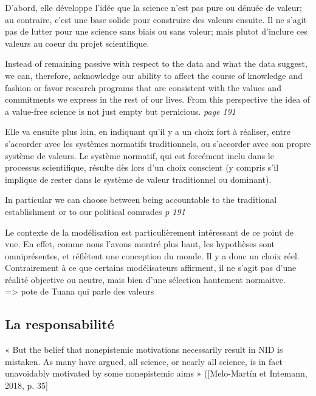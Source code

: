 D'abord, elle développe l'idée que la science n'est pas pure ou dénuée de valeur; au contraire, c'est une base solide pour construire des valeurs ensuite. Il ne s'agit pas de lutter pour une science sans biais ou sans valeur; mais plutot d'inclure ces valeurs au coeur du projet scientifique. 

\begin{displayquote}
    Instead of remaining passive with respect to the data and what the data suggest, we can, therefore, acknowledge our ability to affect the course of knowledge and fashion or favor research programs that are consistent with the values and commitments we express in the rest of our lives. From this perspective the idea of a value-free science is not just empty but pernicious. \textit{page 191}
\end{displayquote}

Elle va ensuite plus loin, en indiquant qu'il y a un choix fort à réaliser, entre s'accorder avec les systèmes normatifs traditionnels, ou s'accorder avec son propre système de valeurs. Le système normatif, qui est forcément inclu dans le processus scientifique, résulte dès lors d'un choix conscient (y compris s'il implique de rester dans le système de valeur traditionnel ou dominant). 

\begin{displayquote}
    In particular we can choose between being accountable to the traditional establishment or to our political comrades \textit{p 191}
\end{displayquote}

Le contexte de la modélisation est particulièrement intéressant de ce point de vue. En effet, comme nous l'avons montré plus haut, les hypothèses sont omniprésentes, et réflètent une conception du monde. Il y a donc un choix réel. Contrairement à ce que certains modélisateurs affirment, il ne s'agit pas d'une réalité objective ou neutre, mais bien d'une sélection hautement normaitve. \\




\cite{helgeson_attention_2022} => pote de Tuana qui parle des valeurs

\subsection{La responsabilité}

\begin{displayquote}
    « But the belief that nonepistemic motivations necessarily result in NID is mistaken. As many have argued, all science, or nearly all science, is in fact unavoidably motivated by some nonepistemic aims » ([Melo-Martín et Intemann, 2018, p. 35]
\end{displayquote}


